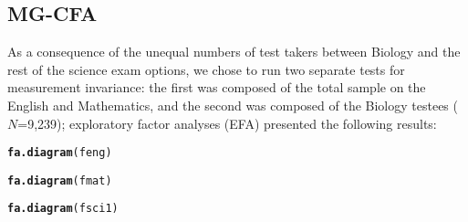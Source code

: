 \documentclass{article}\usepackage[]{graphicx}\usepackage[]{color}
\makeatletter
\newcommand{\hlstd}[1]{\textcolor[rgb]{0.345,0.345,0.345}{#1}}%
\newcommand{\hlkwd}[1]{\textcolor[rgb]{0.737,0.353,0.396}{\textbf{#1}}}%
\newenvironment{kframe}{%
 \def\at@end@of@kframe{}%
 \ifinner\ifhmode%
  \def\at@end@of@kframe{\end{minipage}}%
  \begin{minipage}{\columnwidth}%
 \fi\fi%
 \def\FrameCommand##1{\hskip\@totalleftmargin \hskip-\fboxsep
 \colorbox{shadecolor}{##1}\hskip-\fboxsep
     \hskip-\linewidth \hskip-\@totalleftmargin \hskip\columnwidth}%
 \MakeFramed {\advance\hsize-\width
   \@totalleftmargin\z@ \linewidth\hsize
   \@setminipage}}%
 {\par\unskip\endMakeFramed%
 \at@end@of@kframe}
\newenvironment{knitrout}{}{} %
\makeatother
\begin{document}
\subsection{MG-CFA}
As a consequence of the unequal numbers of test takers between Biology and the rest of the science exam options, we chose to run two separate tests for measurement invariance: the first was composed of the total sample on the English and Mathematics, and the second was composed of the Biology testees ($N$=9,239); exploratory factor analyses (EFA) presented the following results:
\begin{knitrout}
\color{fgcolor}\begin{kframe}
\begin{alltt}
\hlkwd{fa.diagram}\hlstd{(feng)}
\end{alltt}


{\ttfamily\noindent\bfseries{}}\end{kframe}
\end{knitrout}


\begin{knitrout}
\color{fgcolor}\begin{kframe}
\begin{alltt}
\hlkwd{fa.diagram}\hlstd{(fmat)}
\end{alltt}


{\ttfamily\noindent\bfseries{}}\end{kframe}
\end{knitrout}


\begin{knitrout}
\color{fgcolor}\begin{kframe}
\begin{alltt}
\hlkwd{fa.diagram}\hlstd{(fsci1)}
\end{alltt}


{\ttfamily\noindent\bfseries{}}\end{kframe}
\end{knitrout}
\end{document}
